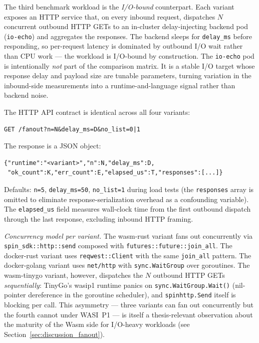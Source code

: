\begin{sloppypar}
The third benchmark workload is the \textit{I/O-bound} counterpart. Each variant exposes an \acs{HTTP} service that, on every inbound request, dispatches $N$ concurrent outbound \acs{HTTP} GETs to an in-cluster delay-injecting backend pod (\texttt{io-echo}) and aggregates the responses. The backend sleeps for \texttt{delay\_ms} before responding, so per-request latency is dominated by outbound I/O wait rather than \acs{CPU} work --- the workload is I/O-bound by construction. The \texttt{io-echo} pod is intentionally \textit{not} part of the comparison matrix. It is a stable I/O target whose response delay and payload size are tunable parameters, turning variation in the inbound-side measurements into a runtime-and-language signal rather than backend noise.
\end{sloppypar}

The \acs{HTTP} \acs{API} contract is identical across all four variants:

\begin{verbatim}
GET /fanout?n=N&delay_ms=D&no_list=0|1
\end{verbatim}

The response is a \acs{JSON} object:
\begin{verbatim}
{"runtime":"<variant>","n":N,"delay_ms":D,
 "ok_count":K,"err_count":E,"elapsed_us":T,"responses":[...]}
\end{verbatim}

\begin{sloppypar}
Defaults: \texttt{n=5}, \texttt{delay\_ms=50}, \texttt{no\_list=1} during load tests (the \texttt{responses} array is omitted to eliminate response-serialization overhead as a confounding variable). The \texttt{elapsed\_us} field measures wall-clock time from the first outbound dispatch through the last response, excluding inbound \acs{HTTP} framing.
\end{sloppypar}

\begin{sloppypar}
\textit{Concurrency model per variant.} The wasm-rust variant fans out concurrently via \texttt{spin\_sdk::http::send} composed with \texttt{futures::future::join\_all}. The docker-rust variant uses \texttt{reqwest::Client} with the same \texttt{join\_all} pattern. The docker-golang variant uses \texttt{net/http} with \texttt{sync.WaitGroup} over goroutines. The wasm-tinygo variant, however, dispatches the $N$ outbound \acs{HTTP} GETs \textit{sequentially}: TinyGo's wasip1 runtime panics on \texttt{sync.WaitGroup.Wait()} (nil-pointer dereference in the goroutine scheduler), and \texttt{spinhttp.Send} itself is blocking per call. This asymmetry --- three variants can fan out concurrently but the fourth cannot under WASI~P1 --- is itself a thesis-relevant observation about the maturity of the Wasm side for I/O-heavy workloads (see Section~\ref{sec:discussion_fanout}).
\end{sloppypar}

